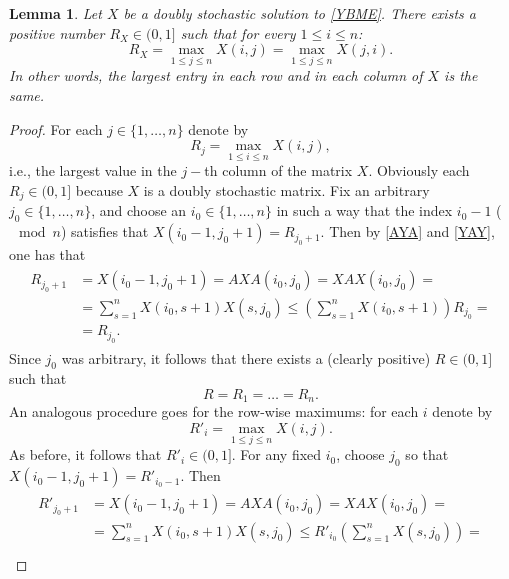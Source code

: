 \documentclass{article}
\newtheorem{lemma}{Lemma}[section]
\theoremstyle{definition}\newtheorem{example}{Example}[section]
\begin{document}
	\begin{lemma}
		Let $X$ be a doubly stochastic solution to \eqref{YBME}. There exists a positive number $R_X\in(0,1]$ such that for every $1\leq i\leq n$:
		\begin{equation}
			\label{R} R_X=\max_{1\leq j\leq n} X(i,j)=\max_{1\leq j\leq n} X(j,i).
		\end{equation}
		In other words, the largest entry in each row and in each column of $X$ is the same.
	\end{lemma}
	\begin{proof} For each $j\in\{1,\ldots,n\}$ denote by
		\begin{equation}\label{Rj}R_j=\max_{1\leq i\leq n} X(i,j),
		\end{equation}
		i.e., the largest value in the $j-$th column of the matrix $X$. Obviously each $R_j\in(0,1]$ because $X$ is a doubly stochastic matrix. Fix an arbitrary $j_0\in\{1,\ldots,n\}$, and choose an $i_0\in\{1,\ldots,n\}$ in such a way that the index $i_0-1$ ($\mod n$) satisfies that $X(i_0-1,j_0+1)=R_{j_0+1}$. Then by \eqref{AYA} and \eqref{YAY}, one has that
		\begin{eqnarray}\label{Rj0}
			\begin{aligned}
				R_{j_0+1}&=X(i_0-1,j_0+1)=AXA(i_0,j_0)=XAX(i_0,j_0)=\\
				&=\sum_{s=1}^n X(i_0,s+1)X(s,j_0)\leq \left(\sum_{s=1}^n X(i_0,s+1)\right)R_{j_0}=\\
				&=R_{j_0}.
		\end{aligned}\end{eqnarray}
		Since $j_0$ was arbitrary, it follows that there exists a (clearly positive) $R\in(0,1]$ such that
		\begin{equation}
			\label{Rjs}
			R=R_1=\ldots=R_n.
		\end{equation}
		An analogous procedure goes for the row-wise maximums: for each $i$ denote by 
		\begin{equation}
			\label{R'i}
			R'_i=\max_{1\leq j\leq n}X(i,j).
		\end{equation}
		As before, it follows that $R'_i\in(0,1]$. For any fixed $i_0$, choose $j_0$ so that $X(i_0-1,j_0+1)=R'_{i_0-1}$. Then 
		\begin{eqnarray}
			\label{Ri0}
			\begin{aligned}
				R'_{j_0+1}&=X(i_0-1,j_0+1)=AXA(i_0,j_0)=XAX(i_0,j_0)=\\
				&=\sum_{s=1}^n X(i_0,s+1)X(s,j_0)\leq R'_{i_0}\left(\sum_{s=1}^n X(s,j_0)\right)=\\

\end{aligned}
\end{eqnarray}
\end{proof}
\end{document}
